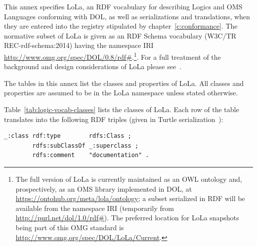 \documentclass[10pt,fleqn,%
\ifpretendfinal
final%
\else
draft%
\fi,
]{scrreprt}
\newcommand*{\termref}[1]{\index{#1}#1\xspace}
\newcommand{\tablerefname}{Table}
\newcommand{\tref}[1]{\tablerefname~\ref{#1}}
\newcommand{\nisref}[1]{#1}
\begin{document}
This annex specifies LoLa, an RDF vocabulary for describing Logics and OMS Languages conforming with DOL, as well as serializations and translations, when they are entered into the \termref{registry} stipulated by chapter~\ref{c:conformance}.
The normative subset of LoLa is given as an RDF Schema vocabulary (\nisref{W3C/TR REC-rdf-schema:2014}) having the namespace IRI \url{http://www.omg.org/spec/DOL/0.8/rdf\#}.\footnote{The full version of LoLa is currently maintained as an OWL ontology and, prospectively, as an OMS library implemented in DOL, at
\url{https://ontohub.org/meta/lola/ontology}; a subset serialized in RDF will be available from the namespace IRI (temporarily from \url{http://purl.net/dol/1.0/rdf\#}). The preferred location for LoLa snapshots being part of this OMG standard is \url{http://www.omg.org/spec/DOL/LoLa/Current}.}.
For a full treatment of the background and design considerations of LoLa please see~\cite{LMK:LoLaModularOntologyLogLangTrans12}.

The tables in this annex list the classes and properties of LoLa.  All classes and properties are assumed to be in the LoLa namespace unless stated otherwise.

\tref{tab:logic-vocab-classes} lists the classes of LoLa.  Each row of the table translates into the following RDF triples (given in Turtle serialization~\cite{W3C:REC-turtle-20140225}):

\begin{lstlisting}[language=N3]
_:class rdf:type        rdfs:Class ;
        rdfs:subClassOf _:superclass ;
        rdfs:comment    "documentation" .
\end{lstlisting}
\end{document}
